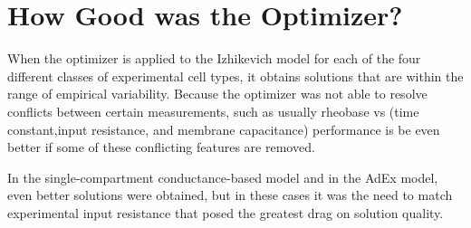 \section{How Good was the Optimizer?}



When the optimizer is applied to the Izhikevich model for each of the four different classes of experimental cell types, it obtains solutions that are within the range of empirical variability.
Because the optimizer was not able to resolve conflicts between certain measurements, such as usually rheobase vs (time constant,input resistance, and membrane capacitance) performance is be even better if some of these conflicting features are removed.

In the single-compartment conductance-based model and in the AdEx model, even better solutions were obtained, but in these cases it was the need to match experimental input resistance that posed the greatest drag on solution quality.










